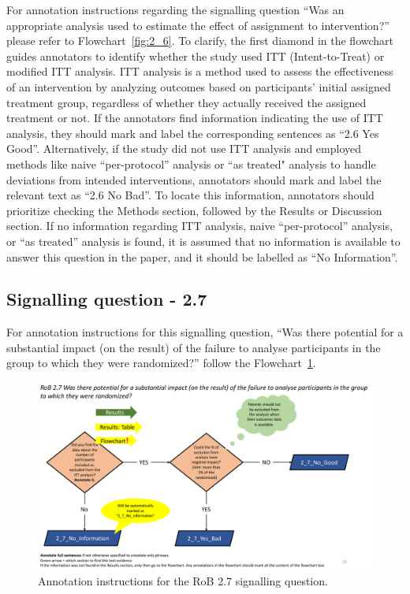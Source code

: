 \documentclass[sn-mathphys,Numbered]{sn-jnl}%
\begin{document}
For annotation instructions regarding the signalling question ``Was an appropriate analysis used to estimate the effect of assignment to intervention?'' please refer to Flowchart~\ref{fig:2_6}.
To clarify, the first diamond in the flowchart guides annotators to identify whether the study used ITT (Intent-to-Treat) or modified ITT analysis.
ITT analysis is a method used to assess the effectiveness of an intervention by analyzing outcomes based on participants' initial assigned treatment group, regardless of whether they actually received the assigned treatment or not.
If the annotators find information indicating the use of ITT analysis, they should mark and label the corresponding sentences as ``2.6 Yes Good''.
Alternatively, if the study did not use ITT analysis and employed methods like naive ``per-protocol'' analysis or ``as treated" analysis to handle deviations from intended interventions, annotators should mark and label the relevant text as ``2.6 No Bad''.
To locate this information, annotators should prioritize checking the Methods section, followed by the Results or Discussion section.
If no information regarding ITT analysis, naive ``per-protocol'' analysis, or ``as treated'' analysis is found, it is assumed that no information is available to answer this question in the paper, and it should be labelled as ``No Information''.
%
%
%
\subsection*{Signalling question - 2.7 }
%
For annotation instructions for this signalling question, ``Was there potential for a substantial impact (on the result) of the failure to analyse participants in the group to which they were randomized?'' follow the Flowchart~\ref{fig:2_7}.
%
\begin{figure}[hbt]
    \centering
    \includegraphics[width=\textwidth]{figures/2_7.pdf}
    \caption{Annotation instructions for the RoB 2.7 signalling question.}
    \label{fig:2_7}
\end{figure}
\end{document}
